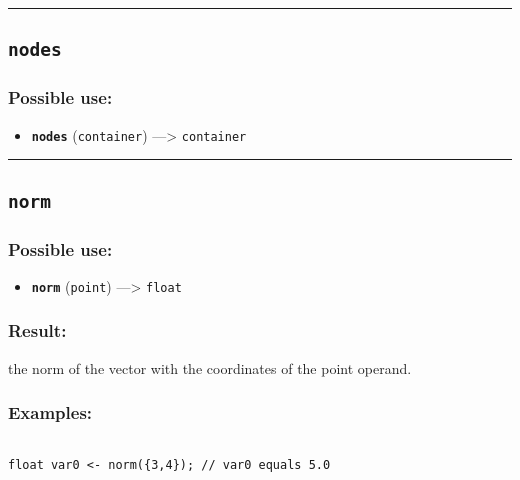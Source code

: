 \documentclass[]{book}
\providecommand{\tightlist}{%
  \setlength{\itemsep}{0pt}\setlength{\parskip}{0pt}}
\theoremstyle{definition}
\theoremstyle{definition}
\theoremstyle{definition}
\theoremstyle{remark}
\begin{document}
\begin{center}\rule{0.5\linewidth}{\linethickness}\end{center}

\subsection{\texorpdfstring{\texttt{nodes}}{nodes}}\label{nodes}

\subsubsection{Possible use:}\label{possible-use-374}

\begin{itemize}
\tightlist
\item
  \textbf{\texttt{nodes}} (\texttt{container}) ---\textgreater{}
  \texttt{container}
\end{itemize}

\begin{center}\rule{0.5\linewidth}{\linethickness}\end{center}

\subsection{\texorpdfstring{\texttt{norm}}{norm}}\label{norm}

\subsubsection{Possible use:}\label{possible-use-375}

\begin{itemize}
\tightlist
\item
  \textbf{\texttt{norm}} (\texttt{point}) ---\textgreater{}
  \texttt{float}
\end{itemize}

\subsubsection{Result:}\label{result-361}

the norm of the vector with the coordinates of the point operand.

\subsubsection{Examples:}\label{examples-260}

\begin{verbatim}
 
float var0 <- norm({3,4}); // var0 equals 5.0
\end{verbatim}
\end{document}
